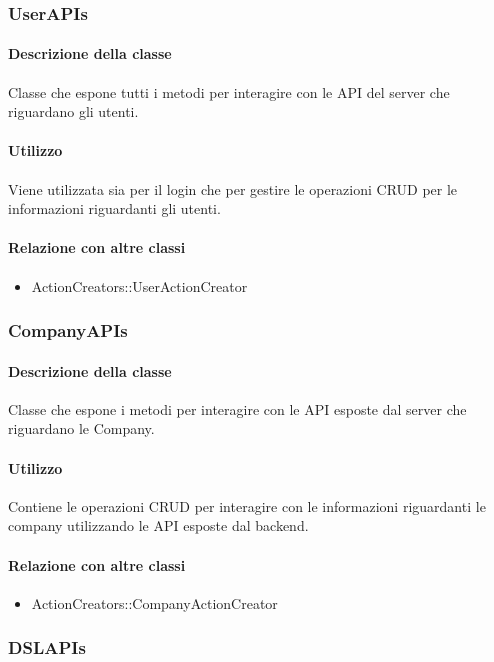 \subsubsection{UserAPIs}
\paragraph*{Descrizione della classe}
Classe che espone tutti i metodi per interagire con le API del server che riguardano gli utenti.

\paragraph*{Utilizzo}
Viene utilizzata sia per il login che per gestire le operazioni CRUD per le informazioni riguardanti gli utenti.

\paragraph*{Relazione con altre classi}
\begin{itemize}
\item ActionCreators::UserActionCreator
\end{itemize}

\subsubsection{CompanyAPIs}
\paragraph*{Descrizione della classe}
Classe che espone i metodi per interagire con le API esposte dal server che riguardano le Company.

\paragraph*{Utilizzo}
Contiene le operazioni CRUD per interagire con le informazioni riguardanti le company utilizzando le API esposte dal backend.

\paragraph*{Relazione con altre classi}
\begin{itemize}
\item ActionCreators::CompanyActionCreator
\end{itemize}

\subsubsection{DSLAPIs}

